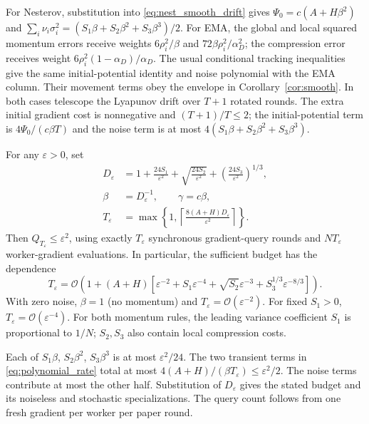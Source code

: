 \begin{codex}
\begin{paperproof}
For Nesterov, substitution into \eqref{eq:nest_smooth_drift} gives
$\Psi_0=c(A+H\beta^2)$ and
$\sum_i\nu_i\sigma_i^2=(S_1\beta+S_2\beta^2+S_3\beta^3)/2$.
For EMA, the global and local squared momentum errors receive weights
$6\rho_i^2/\beta$ and $72\beta\rho_i^2/\alpha_D^2$;
the compression error receives weight
$6\rho_i^2(1-\alpha_D)/\alpha_D$.
The usual conditional tracking inequalities give the same initial-potential
identity and noise polynomial with the EMA column. Their movement terms
obey the envelope in Corollary~\ref{cor:smooth}.
In both cases telescope the Lyapunov drift over $T+1$ rotated rounds.
The extra initial gradient cost is nonnegative and $(T+1)/T\le2$;
the initial-potential term is $4\Psi_0/(c\beta T)$ and the noise term
is at most $4(S_1\beta+S_2\beta^2+S_3\beta^3)$.
\end{paperproof}

\begin{corollary}\label{cor:accuracy_budget}
For any $\varepsilon>0$, set
\begin{align*}
 D_\varepsilon&=1+\frac{24S_1}{\varepsilon^2}
       +\sqrt{\frac{24S_2}{\varepsilon^2}}
       +\left(\frac{24S_3}{\varepsilon^2}\right)^{1/3},\\
 \beta&=D_\varepsilon^{-1},\qquad \gamma=c\beta,\\
 T_\varepsilon&=\max\!\left\{1,
   \left\lceil\frac{8(A+H)D_\varepsilon}{\varepsilon^2}\right\rceil\right\}.
\end{align*}
Then $Q_{T_\varepsilon}\le\varepsilon^2$, using exactly
$T_\varepsilon$ synchronous gradient-query rounds and
$NT_\varepsilon$ worker-gradient evaluations.
In particular, the sufficient budget has the dependence
\[
 T_\varepsilon=\mathcal O\!\left(1+(A+H)
 [\varepsilon^{-2}+S_1\varepsilon^{-4}
  +\sqrt{S_2}\varepsilon^{-3}+S_3^{1/3}\varepsilon^{-8/3}]\right).
\]
With zero noise, $\beta=1$ (no momentum) and
$T_\varepsilon=\mathcal O(\varepsilon^{-2})$.
For fixed $S_1>0$, $T_\varepsilon=\mathcal O(\varepsilon^{-4})$.
For both momentum rules, the leading variance coefficient $S_1$ is
proportional to $1/N$; $S_2,S_3$ also contain local compression costs.
\end{corollary}
\begin{paperproof}
Each of $S_1\beta$, $S_2\beta^2$, $S_3\beta^3$ is at most
$\varepsilon^2/24$. The two transient terms in
\eqref{eq:polynomial_rate} total at most
$4(A+H)/(\beta T_\varepsilon)\le\varepsilon^2/2$.
The noise terms contribute at most the other half. Substitution of
$D_\varepsilon$ gives the stated budget and its noiseless and stochastic
specializations. The query count follows from one fresh gradient per
worker per paper round.
\end{paperproof}
\end{codex}
